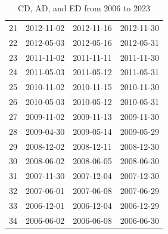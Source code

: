 \begin{appendices}
\begin{table}[H]
\begin{minipage}{.5\textwidth}
\begin{tabular}{llll}
21 & 2012-11-02 & 2012-11-16 & 2012-11-30 \\ 
22 & 2012-05-03 & 2012-05-16 & 2012-05-31 \\ 
23 & 2011-11-02 & 2011-11-11 & 2011-11-30 \\ 
24 & 2011-05-03 & 2011-05-12 & 2011-05-31 \\ 
25 & 2010-11-02 & 2010-11-15 & 2010-11-30 \\ 
26 & 2010-05-03 & 2010-05-12 & 2010-05-31 \\ 
27 & 2009-11-02 & 2009-11-13 & 2009-11-30 \\ 
28 & 2009-04-30 & 2009-05-14 & 2009-05-29 \\ 
29 & 2008-12-02 & 2008-12-11 & 2008-12-30 \\ 
30 & 2008-06-02 & 2008-06-05 & 2008-06-30 \\ 
31 & 2007-11-30 & 2007-12-04 & 2007-12-30 \\ 
32 & 2007-06-01 & 2007-06-08 & 2007-06-29 \\ 
33 & 2006-12-01 & 2006-12-04 & 2006-12-29 \\ 
34 & 2006-06-02 & 2006-06-08 & 2006-06-30 \\ 
\hline
\end{tabular}
\end{minipage}
\vspace{1em}
\caption{CD, AD, and ED from 2006 to 2023}
\end{table}










\end{appendices}
